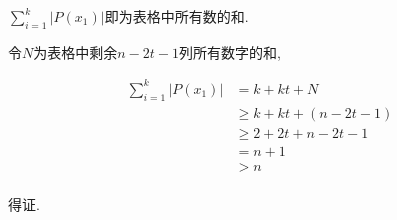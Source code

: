 \documentclass[8pt]{article}
\begin{document}
\begin{enumerate}
			$\sum_{i=1}^{k} |P(x_1)|$即为表格中所有数的和.

			令$N$为表格中剩余$n-2t-1$列所有数字的和,

			$$\begin{aligned}
				\sum_{i=1}^{k} |P(x_1)| &= k + kt + N\\
				&\geq k + kt + (n - 2t - 1)\\
				&\geq 2 + 2t + n - 2t - 1\\
				&= n + 1\\
				&> n\\
			\end{aligned} $$

			得证.

	\end{enumerate}
\end{document}
